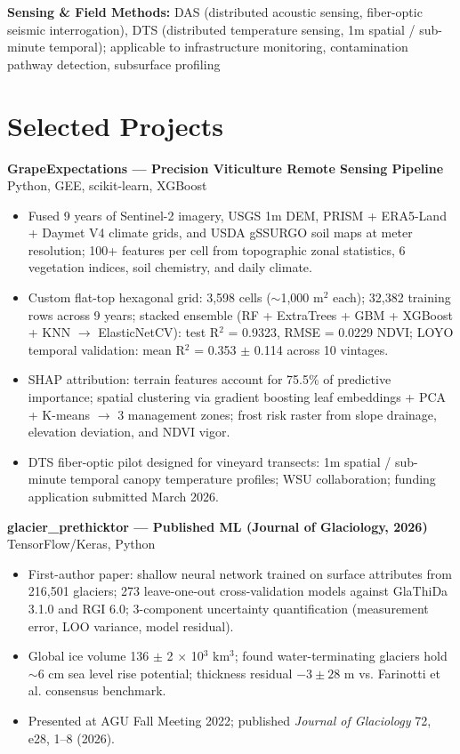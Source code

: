 \documentclass[11pt,a4paper]{article}
\begin{document}
\noindent
\textbf{Sensing \& Field Methods:} DAS (distributed acoustic sensing, fiber-optic seismic interrogation), DTS (distributed temperature sensing, 1m spatial / sub-minute temporal); applicable to infrastructure monitoring, contamination pathway detection, subsurface profiling

\section*{Selected Projects}

\noindent
\textbf{GrapeExpectations --- Precision Viticulture Remote Sensing Pipeline} \hfill Python, GEE, scikit-learn, XGBoost
\begin{itemize}
    \item Fused 9 years of Sentinel-2 imagery, USGS 1m DEM, PRISM + ERA5-Land + Daymet V4 climate grids, and USDA gSSURGO soil maps at meter resolution; 100+ features per cell from topographic zonal statistics, 6 vegetation indices, soil chemistry, and daily climate.
    \item Custom flat-top hexagonal grid: 3,598 cells ($\sim$1,000 m$^2$ each); 32,382 training rows across 9 years; stacked ensemble (RF + ExtraTrees + GBM + XGBoost + KNN $\rightarrow$ ElasticNetCV): test R$^2$ = 0.9323, RMSE = 0.0229 NDVI; LOYO temporal validation: mean R$^2$ = 0.353 $\pm$ 0.114 across 10 vintages.
    \item SHAP attribution: terrain features account for 75.5\% of predictive importance; spatial clustering via gradient boosting leaf embeddings + PCA + K-means $\rightarrow$ 3 management zones; frost risk raster from slope drainage, elevation deviation, and NDVI vigor.
    \item DTS fiber-optic pilot designed for vineyard transects: 1m spatial / sub-minute temporal canopy temperature profiles; WSU collaboration; funding application submitted March 2026.
\end{itemize}

\vspace{0.2cm}
\noindent
\textbf{glacier\_prethicktor --- Published ML (Journal of Glaciology, 2026)} \hfill TensorFlow/Keras, Python
\begin{itemize}
    \item First-author paper: shallow neural network trained on surface attributes from 216,501 glaciers; 273 leave-one-out cross-validation models against GlaThiDa 3.1.0 and RGI 6.0; 3-component uncertainty quantification (measurement error, LOO variance, model residual).
    \item Global ice volume 136 $\pm$ 2 $\times$ 10$^3$ km$^3$; found water-terminating glaciers hold $\sim$6 cm sea level rise potential; thickness residual $-3 \pm 28$ m vs. Farinotti et al. consensus benchmark.
    \item Presented at AGU Fall Meeting 2022; published \textit{Journal of Glaciology} 72, e28, 1--8 (2026).
\end{itemize}
\end{document}

